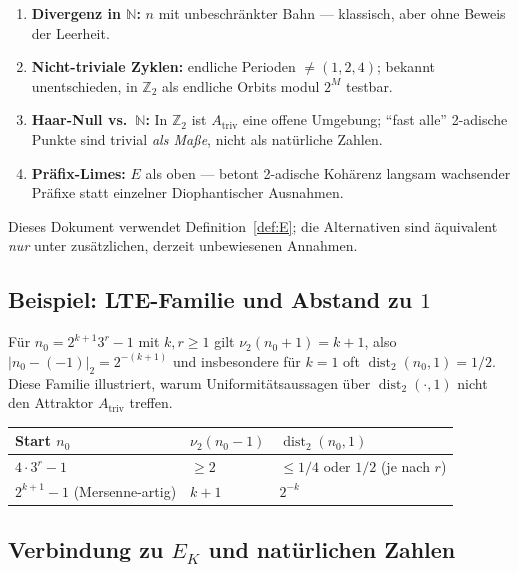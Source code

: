 \documentclass[12pt,a4paper]{article}
\newcommand{\vii}{\nu_2}
\newcommand{\N}{\mathbb{N}}
\newcommand{\Ztwo}{\mathbb{Z}_2}
\newcommand{\disttwo}{\operatorname{dist}_2}
\begin{document}
\begin{tcolorbox}[heuristik,title={Alternative Lesarten von $E$}]
\begin{enumerate}[label=(\alph*),nosep]
  \item \textbf{Divergenz in $\N$:} $n$ mit unbeschr\"ankter Bahn --- klassisch,
    aber ohne Beweis der Leerheit.
  \item \textbf{Nicht-triviale Zyklen:} endliche Perioden $\neq(1,2,4)$;
    bekannt unentschieden, in $\Ztwo$ als endliche Orbits modul $2^M$ testbar.
  \item \textbf{Haar-Null vs.\ $\N$:} In $\Ztwo$ ist $A_{\mathrm{triv}}$ eine
    offene Umgebung; ``fast alle'' 2-adische Punkte sind trivial \emph{als Ma\ss e},
    nicht als nat\"urliche Zahlen.
  \item \textbf{Pr\"afix-Limes:} $E$ als oben --- betont 2-adische Koh\"arenz
    langsam wachsender Pr\"afixe statt einzelner Diophantischer Ausnahmen.
\end{enumerate}
Dieses Dokument verwendet Definition~\ref{def:E}; die Alternativen sind
\"aquivalent \emph{nur} unter zus\"atzlichen, derzeit unbewiesenen Annahmen.
\end{tcolorbox}


\subsection{Beispiel: LTE-Familie und Abstand zu $1$}

Für $n_0=2^{k+1}3^r-1$ mit $k,r\geq 1$ gilt $\vii(n_0+1)=k+1$, also
$|n_0-(-1)|_2=2^{-(k+1)}$ und insbesondere für $k=1$ oft $\disttwo(n_0,1)=1/2$.
Diese Familie illustriert, warum Uniformitätsaussagen über $\disttwo(\cdot,1)$
nicht den Attraktor $A_{\mathrm{triv}}$ treffen.

\begin{center}
\begin{tabular}{@{}lll@{}}
\toprule
Start $n_0$ & $\vii(n_0-1)$ & $\disttwo(n_0,1)$ \\
\midrule
$4\cdot 3^r-1$ & $\geq 2$ & $\leq 1/4$ oder $1/2$ (je nach $r$) \\
$2^{k+1}-1$ (Mersenne-artig) & $k+1$ & $2^{-k}$ \\
\bottomrule
\end{tabular}
\end{center}

\subsection{Verbindung zu $E_K$ und natürlichen Zahlen}
\end{document}
